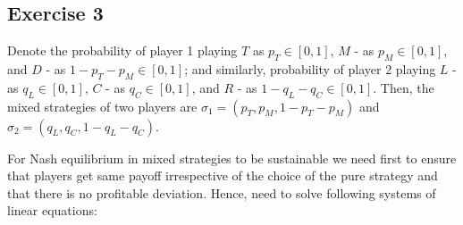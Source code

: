 \documentclass[]{article}
\begin{document}
\subsection*{Exercise 3}

Denote the probability of player 1 playing $T$ as $p_T\in[0, 1]$, $M$ - as $p_M\in[0, 1]$, and $D$ - as $1 - p_T - p_M\in[0, 1]$; and similarly, probability of player 2 playing $L$ - as $q_L\in[0, 1]$, $C$ - as $q_C\in[0, 1]$, and $R$ - as $1 - q_L - q_C\in[0, 1]$. Then, the mixed strategies of two players are $\sigma_1 = (p_T, p_M, 1 - p_T - p_M)$ and $\sigma_2 = (q_L, q_C, 1 - q_L - q_C)$. %

For Nash equilibrium in mixed strategies to be sustainable we need first to ensure that players get same payoff irrespective of the choice of the pure strategy and that there is no profitable deviation. Hence, need to solve following systems of linear equations:
\end{document}

